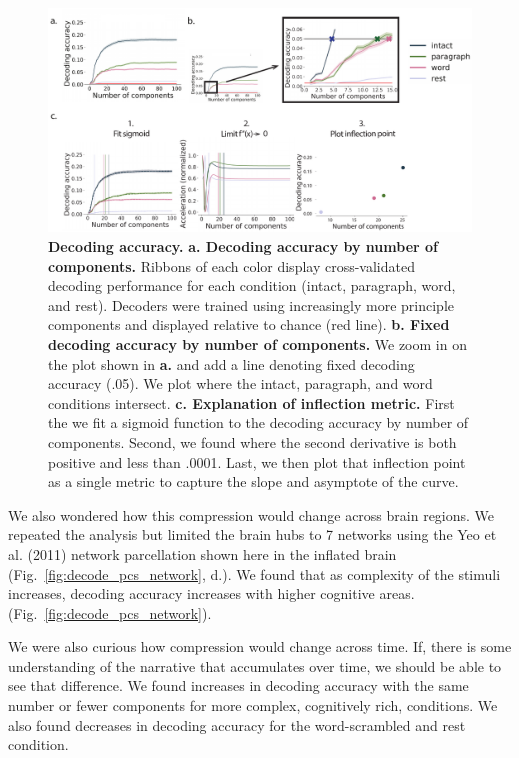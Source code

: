 \begin{figure}
  \centering
  \includegraphics[width=\textwidth]{figs/decode_interpret.pdf}
  \caption{\textbf{Decoding accuracy.} \textbf{a. Decoding accuracy by
      number of components.} Ribbons of each color display
    cross-validated decoding performance for each condition (intact,
    paragraph, word, and rest). Decoders were trained using
    increasingly more principle components and displayed relative to
    chance (red line). \textbf{b. Fixed decoding accuracy by number of
      components.} We zoom in on the plot shown in \textbf{a.} and add
    a line denoting fixed decoding accuracy (.05). We plot where the
    intact, paragraph, and word conditions intersect.
    \textbf{c. Explanation of inflection metric.} First the we fit a sigmoid function to the decoding accuracy by number of components. Second, we found where the second derivative is both positive and less than .0001. Last, we then plot that inflection point as a single metric to capture the slope and asymptote of the curve.}
    \label{fig:decode_interpret}
  \end{figure}




  We also wondered how this compression would change across brain regions.  We repeated the analysis but limited the brain hubs to 7 networks using the Yeo et al. (2011) network parcellation shown here in the inflated brain (Fig.~\ref{fig:decode_pcs_network}, d.). We found that as complexity of the stimuli increases, decoding accuracy increases
  with higher cognitive areas. (Fig.~\ref{fig:decode_pcs_network}).





We were also curious how compression would change across time.  If, there is some understanding of the narrative that accumulates over time, we should be able to see that difference. We found increases in decoding accuracy with the same number or fewer components for more complex, cognitively rich, conditions.
We also found decreases in decoding accuracy for the word-scrambled and rest
condition.


